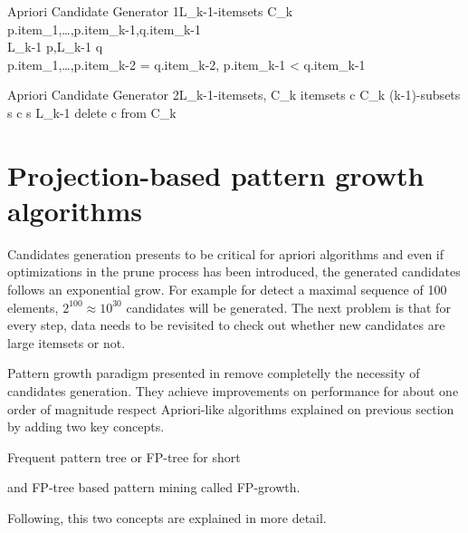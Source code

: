 \begin{pseudocode}{Apriori Candidate Generator 1}{L_{k-1}-itemsets}
\label{pc:apriori_candidate_generator1}
 \quad C_{k}\\
 \quad p.item_{1},\ldots,p.item_{k-1},q.item_{k-1}\\
 \quad L_{k-1} \quad p,L_{k-1} \quad q\\
 \quad p.item_{1},\ldots,p.item_{k-2} = q.item_{k-2}, 
p.item_{k-1} < q.item_{k-1}\\
\end{pseudocode}


\begin{pseudocode}{Apriori Candidate Generator 2}{L_{k-1}-itemsets, C_{k}}
\label{pc:apriori_candidate_generator2}
    \FORALL itemsets \quad c \in C_{k} \DO
    \BEGIN
        \FORALL (k-1)-subsets \quad s \in c \DO
        \BEGIN
            \IF s \not\in  L_{k-1} \THEN
                delete \quad c \quad from \quad C_{k}\\
        \END
    \END
\end{pseudocode}


\section{Projection-based pattern growth
algorithms}\label{ss:projection_based}

Candidates generation presents to be critical for apriori algorithms and even if
optimizations in the prune process has been introduced, the generated candidates
follows an exponential grow. For example for detect a maximal sequence of 100
elements, $2^{100} \approx 10^{30}$ candidates will be generated. The next
problem is that for every step, data needs to be revisited to check out whether 
new candidates are large itemsets or not. 

Pattern growth paradigm presented in \cite{han2000mining1} remove
completelly the necessity of candidates generation. They achieve improvements on
performance for about one order of magnitude respect Apriori-like algorithms
explained on previous section by adding two key concepts. 
\begin{enumerate*}[label=(\roman*)]
  \item Frequent pattern tree or FP-tree for short
  \item and FP-tree based pattern mining called FP-growth.
\end{enumerate*}
Following, this two concepts are explained in more detail.

